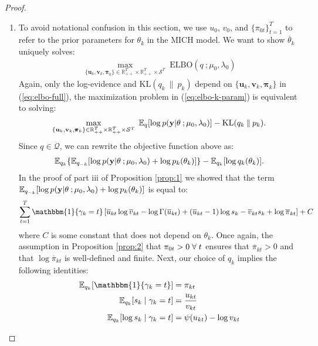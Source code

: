 \begin{proof}
\begin{enumerate}[label=\roman*.]
\item To avoid notational confusion in this section, we use $u_0$, $v_0$, and $\{\pi_{0t}\}_{t=1}^T$ to refer to the prior parameters for $\theta_k$ in the MICH model. We want to show $\overline{\theta}_k$ uniquely solves: 
\begin{align}
    \max_{\{\mathbf{u}_k, \mathbf{v}_k, \pmb{\pi}_k\} \in \mathbb{R}_{++}^T\times\mathbb{R}_{++}^T \times\mathcal{S}^T} \;  \text{ELBO}(q\:;\mu_0,\lambda_0) \label{eq:elbo-k-param}
\end{align}
Again, only the log-evidence and $\text{KL}(q_k\:\lVert\: p_k)$ depend on $\{\mathbf{u}_k, \mathbf{v}_k, \pmb{\pi}_k\}$ in (\ref{eq:elbo-full}), the maximization problem in (\ref{eq:elbo-k-param}) is equivalent to solving: 
\begin{align*}
    \max_{\{\mathbf{u}_k, \mathbf{v}_k, \pmb{\pi}_k\} \in \mathbb{R}_{++}^T\times\mathbb{R}_{++}^T \times\mathcal{S}^T} \;  \mathbb{E}_q[\log p(\mathbf{y}| \theta\:; \mu_0,\lambda_0)] - \text{KL}(q_k\:\lVert\: p_k).
\end{align*}
Since $q \in \mathcal{Q}$, we can rewrite the objective function above as:
\begin{align*}
    \mathbb{E}_{q_k}\{\mathbb{E}_{q_{-k}}[\log p(\mathbf{y}| \theta\:; \mu_0,\lambda_0)+\log p_k(\theta_k)]\} - \mathbb{E}_{q_k}[\log q_k(\theta_k)].
\end{align*}
In the proof of part iii of Proposition \ref{prop:1} we showed that the term $\mathbb{E}_{q_{-k}}[\log p(\mathbf{y}| \theta\:; \mu_0,\lambda_0)+\log p_k(\theta_k)]$ is equal to:
\begin{align*}
     \sum_{t=1}^T \mathbbm{1}\{\gamma_k = t\}\left[ \overline{u}_{kt} \log \overline{v}_{kt} -  \log\Gamma(\overline{u}_{kt}) + \left(\overline{u}_{kt} -1\right)\log s_{k}  - \overline{v}_{kt} s_{k} + \log \overline{\pi}_{kt}\right] + C
\end{align*}
where $C$ is some constant that does not depend on $\theta_k$. Once again, the assumption in Proposition \ref{prop:2} that $\pi_{0t} > 0 \;\forall\; t$ ensures that $\overline{\pi}_{kt} > 0$ and that $\log \overline{\pi}_{kt}$ is well-defined and finite. Next, our choice of $q_k$ implies the following identities:
\begin{align*}
    \E_{q_k}[\mathbbm{1}\{\gamma_k = t\}] &= \pi_{kt} \\
    \E_{q_k}[s_{k}\;|\;\gamma_k=t] &= \frac{u_{kt}}{v_{kt}} \\
    \E_{q_k}[\log s_{k}\;|\;\gamma_k=t] &= \psi(u_{kt}) - \log v_{kt}
\end{align*}

\end{enumerate}
\end{proof}
